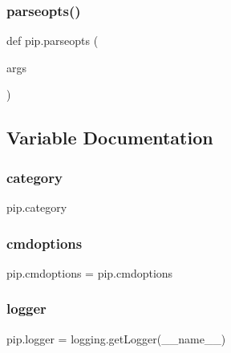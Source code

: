 \subsubsection{\texorpdfstring{parseopts()}{parseopts()}}
{\footnotesize\ttfamily def pip.\+parseopts (\begin{DoxyParamCaption}\item[{}]{args }\end{DoxyParamCaption})}



\subsection{Variable Documentation}
\mbox{\label{namespacepip_a24769fde21b80a15cd9324326010d7f4}} 
\subsubsection{\texorpdfstring{category}{category}}
{\footnotesize\ttfamily pip.\+category}

\mbox{\label{namespacepip_a95057821f4c9c87cd8cb9288b2e67019}} 
\subsubsection{\texorpdfstring{cmdoptions}{cmdoptions}}
{\footnotesize\ttfamily pip.\+cmdoptions = pip.\+cmdoptions}

\mbox{\label{namespacepip_ab0343c04452146bb374715148076ed68}} 
\subsubsection{\texorpdfstring{logger}{logger}}
{\footnotesize\ttfamily pip.\+logger = logging.\+get\+Logger(\+\_\+\+\_\+name\+\_\+\+\_\+)}

